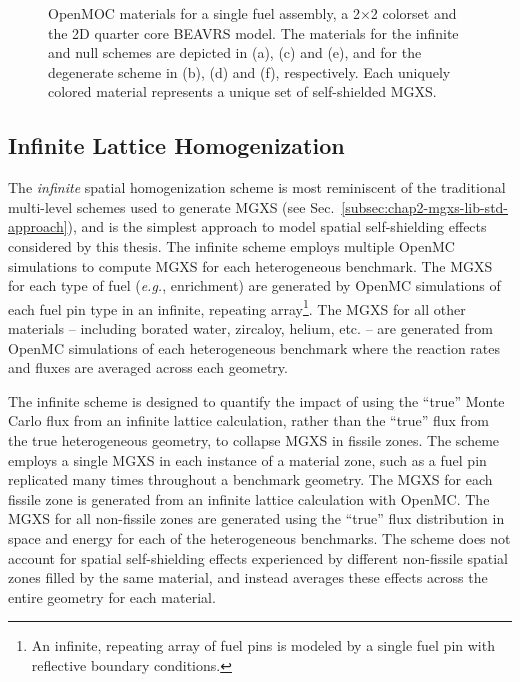 \begin{figure}[h!]
\begin{subfigure}{.45\textwidth}
  \caption{}
  \label{fig:chap8-full-core-degenerate-materials}
\end{subfigure}
\caption[Depiction of infinite, null and degenerate spatial homogenization schemes]{OpenMOC materials for a single fuel assembly, a 2$\times$2 colorset and the 2D quarter core \ac{BEAVRS} model. The materials for the infinite and null schemes are depicted in (a), (c) and (e), and for the degenerate scheme in (b), (d) and (f), respectively. Each uniquely colored material represents a unique set of self-shielded \ac{MGXS}.}
\label{fig:chap8-homogenization-schemes}
\end{figure}

\subsection{Infinite Lattice Homogenization}
\label{subsec:chap8-infinite}

The \textit{infinite} spatial homogenization scheme is most reminiscent of the traditional multi-level schemes used to generate \ac{MGXS} (see Sec.~\ref{subsec:chap2-mgxs-lib-std-approach}), and is the simplest approach to model spatial self-shielding effects considered by this thesis. The infinite scheme employs multiple OpenMC simulations to compute \ac{MGXS} for each heterogeneous benchmark. The \ac{MGXS} for each type of fuel (\textit{e.g.}, enrichment) are generated by OpenMC simulations of each fuel pin type in an infinite, repeating array\footnote{An infinite, repeating array of fuel pins is modeled by a single fuel pin with reflective boundary conditions.}. The \ac{MGXS} for all other materials -- including borated water, zircaloy, helium, etc. -- are generated from OpenMC simulations of each heterogeneous benchmark where the reaction rates and fluxes are averaged across each geometry.

The infinite scheme is designed to quantify the impact of using the ``true'' Monte Carlo flux from an infinite lattice calculation, rather than the ``true'' flux from the true heterogeneous geometry, to collapse \ac{MGXS} in fissile zones. The scheme employs a single \ac{MGXS} in each instance of a material zone, such as a fuel pin replicated many times throughout a benchmark geometry. The \ac{MGXS} for each fissile zone is generated from an infinite lattice calculation with OpenMC. The \ac{MGXS} for all non-fissile zones are generated using the ``true''  flux distribution in space and energy for each of the heterogeneous benchmarks. The scheme does not account for spatial self-shielding effects experienced by different non-fissile spatial zones filled by the same material, and instead averages these effects across the entire geometry for each material.

